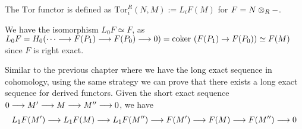 \begin{definition}
    The $\mathrm{Tor}$ functor is defined as $\mathrm{Tor}_i^R(N, M) := L_i F(M)$ for $F = N \otimes_R -$.
\end{definition}

\begin{remark}
    We have the isomorphism $L_0 F \simeq F$, as $L_0 F = H_0(\cdots \longrightarrow F(P_1) \longrightarrow F(P_0) \longrightarrow 0) = \mathrm{coker}\ (F(P_1) \to F(P_0)) \simeq F(M)$ since $F$ is right exact. 
\end{remark}

\begin{remark}
    Similar to the previous chapter where we have the long exact sequence in cohomology, using the same strategy we can prove that there exists a long exact sequence for derived functors. Given the short exact sequence $0 \longrightarrow M' \longrightarrow M \longrightarrow M'' \longrightarrow 0$, we have
    \[
        L_1F(M') \longrightarrow L_1F(M) \longrightarrow L_1F(M'') \longrightarrow F(M') \longrightarrow F(M) \longrightarrow F(M'') \longrightarrow 0
    \]
\end{remark}